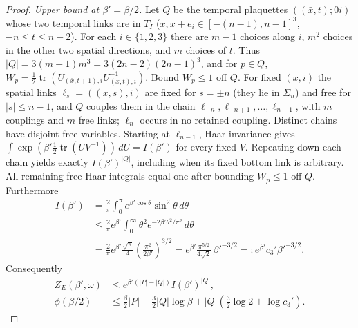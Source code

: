 \documentclass[11pt,a4paper]{article}
\theoremstyle{plain}
\theoremstyle{definition}
\theoremstyle{remark}
\numberwithin{equation}{section}
\newcommand{\tr}{\operatorname{tr}}
\begin{document}
\begin{proof}
\emph{Upper bound at $\beta'=\beta/2$.} Let $Q$ be the temporal plaquettes $((\bar x,t);0i)$ whose two temporal links are in $T_I$
($\bar x,\bar x+e_i\in[-(n-1),n-1]^3$, $-n\le t\le n-2$).
For each $i\in\{1,2,3\}$ there are $m-1$ choices along $i$, $m^2$ choices in the other two spatial directions, and $m$ choices of $t$.
Thus $|Q|=3(m-1)m^3=3(2n-2)(2n-1)^3$, and for $p\in Q$,
$W_p=\frac12\tr(U_{(\bar x,t+1),i}U_{(\bar x,t),i}^{-1})$. Bound $W_p\le1$ off $Q$. For fixed $(\bar x,i)$ the spatial links
$\ell_s=((\bar x,s),i)$ are fixed for $s=\pm n$ (they lie in $\Sigma_n$) and free for $|s|\le n-1$, and $Q$ couples them in the chain
$\ell_{-n},\ell_{-n+1},\dots,\ell_{n-1}$, with $m$ couplings and $m$ free links; $\ell_n$ occurs in no retained coupling.
Distinct chains have disjoint free variables. Starting at $\ell_{n-1}$, Haar invariance gives
$\int\exp(\beta'\tfrac12\tr(UV^{-1}))\,dU=I(\beta')$ for every fixed $V$.
Repeating down each chain yields exactly $I(\beta')^{|Q|}$, including when its fixed bottom link is arbitrary.
All remaining free Haar integrals equal one after bounding $W_p\le1$ off $Q$. Furthermore
\[
\begin{split}
I(\beta')
&=\frac2\pi\int_0^\pi e^{\beta'\cos\theta}\sin^2\theta\,d\theta\\
&\le\frac2\pi e^{\beta'}\int_0^\infty\theta^2e^{-2\beta'\theta^2/\pi^2}\,d\theta\\
&=\frac2\pi e^{\beta'}\frac{\sqrt\pi}{4}
                 \left(\frac{\pi^2}{2\beta'}\right)^{3/2}
 =e^{\beta'}\frac{\pi^{5/2}}{4\sqrt2}\,\beta'^{-3/2}
 =:e^{\beta'}c_3'\beta'^{-3/2}.
\end{split}
\]
Consequently
\[
\begin{split}
Z_E(\beta',\omega)&\le e^{\beta'(|P|-|Q|)}I(\beta')^{|Q|},\\
\phi(\beta/2)&\le\frac\beta2|P|-\frac32|Q|\log\beta
                    +|Q|\left(\frac32\log2+\log c_3'\right).
\end{split}
\]


\end{proof}
\end{document}
